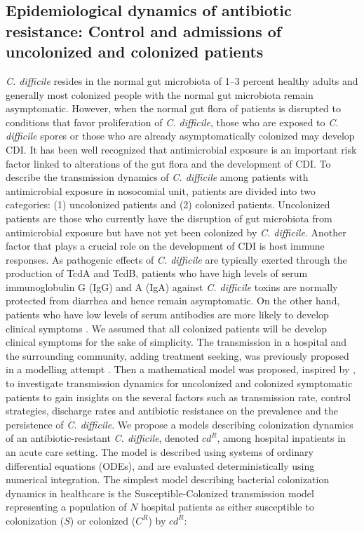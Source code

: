 \documentclass{article}
\begin{document}
\subsection{Epidemiological dynamics of antibiotic
resistance: Control and admissions of uncolonized and colonized patients}

{\it C. difficile} resides in the normal gut microbiota of 1–3 percent healthy adults and generally most colonized people with the normal gut microbiota remain asymptomatic. However, when the normal gut flora of patients is disrupted to conditions that favor proliferation of {\it C. difficile}, those who are exposed to {\it C. difficile} spores or those who are already asymptomatically colonized may develop CDI. It has been well recognized that antimicrobial exposure is an important risk factor linked to alterations of the gut
flora and the development of CDI. To describe the transmission dynamics of {\it C. difficile} among patients with antimicrobial exposure in nosocomial unit, patients are divided into two categories: (1) uncolonized patients and (2) colonized patients. Uncolonized patients are those who currently have the disruption of gut microbiota from antimicrobial exposure but have not yet been colonized by {\it C. difficile}. Another factor that plays a crucial role on the development of CDI is host immune responses. As pathogenic effects of {\it C. difficile} are typically exerted through the production of TcdA and TcdB, patients who have high levels of serum immunoglobulin G (IgG) and A (IgA) against {\it C. difficile} toxins are normally protected from diarrhea and hence remain asymptomatic. On the other hand, patients who have low levels of serum antibodies are more likely to develop clinical symptoms \cite{Chamchod}. We assumed that all colonized patients will be develop clinical symptoms for the sake of simplicity. The transmission in a hospital and the surrounding community, adding treatment seeking, was previously proposed in a modelling attempt \cite{McLure}. Then a mathematical model was proposed,  inspired by \cite{Smith}, to investigate transmission dynamics for uncolonized and colonized symptomatic patients to gain insights on the several factors such as transmission rate, control strategies, discharge rates and antibiotic resistance on the prevalence and the persistence of {\it C. difficile}. We propose a models describing colonization dynamics of an antibiotic-resistant {\it C. difficile}, denoted ${cd}^{R}$, among hospital inpatients in an acute care setting. The model is described using systems of ordinary differential equations (ODEs), and are evaluated deterministically using numerical integration. The simplest model describing bacterial colonization dynamics in healthcare is the Susceptible-Colonized transmission model representing a population of $N$ hospital patients as either susceptible to colonization ($S$) or colonized (${C}^{R}$) by ${cd}^{R}$:
\end{document}

